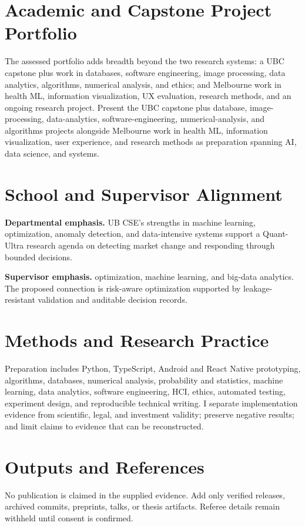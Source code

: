 \documentclass[11pt]{article}
\begin{document}
\section*{Academic and Capstone Project Portfolio}
The assessed portfolio adds breadth beyond the two research systems: a UBC capstone plus work in databases, software engineering, image processing, data analytics, algorithms, numerical analysis, and ethics; and Melbourne work in health ML, information visualization, UX evaluation, research methods, and an ongoing research project. Present the UBC capstone plus database, image-processing, data-analytics, software-engineering, numerical-analysis, and algorithms projects alongside Melbourne work in health ML, information visualization, user experience, and research methods as preparation spanning AI, data science, and systems.

\section*{School and Supervisor Alignment}
\textbf{Departmental emphasis.} UB CSE's strengths in machine learning, optimization, anomaly detection, and data-intensive systems support a Quant-Ultra research agenda on detecting market change and responding through bounded decisions.

\textbf{Supervisor emphasis.} optimization, machine learning, and big-data analytics. The proposed connection is risk-aware optimization supported by leakage-resistant validation and auditable decision records.

\section*{Methods and Research Practice}
Preparation includes Python, TypeScript, Android and React Native prototyping, algorithms, databases, numerical analysis, probability and statistics, machine learning, data analytics, software engineering, HCI, ethics, automated testing, experiment design, and reproducible technical writing. I separate implementation evidence from scientific, legal, and investment validity; preserve negative results; and limit claims to evidence that can be reconstructed.

\section*{Outputs and References}
No publication is claimed in the supplied evidence. Add only verified releases, archived commits, preprints, talks, or thesis artifacts. Referee details remain withheld until consent is confirmed.
\end{document}

